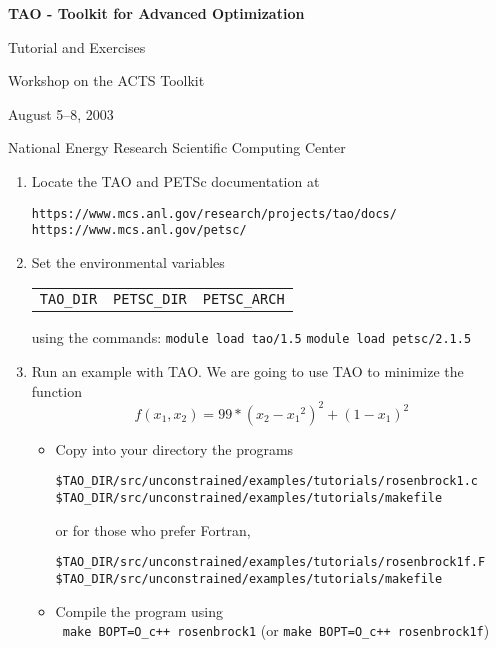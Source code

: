 \documentclass[11pt]{article}
\begin{document}
\begin{center}
{\bf
TAO - Toolkit for Advanced Optimization
        
Tutorial and Exercises

\vspace{0.25in}

Workshop on the ACTS Toolkit

August 5--8, 2003

National Energy Research Scientific Computing Center
}
\end{center}
\vspace{0.25in}

\begin{enumerate}

\item Locate the TAO and PETSc documentation at 
\begin{alltt}
https://www.mcs.anl.gov/research/projects/tao/docs/
https://www.mcs.anl.gov/petsc/
\end{alltt}

\item Set the environmental variables\\
\begin{tabular}{ccc}
\texttt{TAO\_DIR} & \texttt{PETSC\_DIR} & \texttt{PETSC\_ARCH} 
\end{tabular}
using the commands:
\quad \texttt{module load tao/1.5}
\quad \texttt{module load petsc/2.1.5}


\item Run an example with TAO.
We are going to use TAO to minimize the function 
\[
    f(x_1,x_2) = 99*(x_2-{x_1}^2)^2 + (1-x_1)^2 
\]

\begin{itemize}
 \item Copy into your directory the programs
  \begin{alltt}
    \$TAO_DIR/src/unconstrained/examples/tutorials/rosenbrock1.c
    \$TAO_DIR/src/unconstrained/examples/tutorials/makefile
  \end{alltt}
  or for those who prefer Fortran,
  \begin{alltt}
    \$TAO_DIR/src/unconstrained/examples/tutorials/rosenbrock1f.F
    \$TAO_DIR/src/unconstrained/examples/tutorials/makefile
  \end{alltt}

 \item Compile the program using \\
  \quad \texttt{ make BOPT=O\_c++ rosenbrock1} 
  (or \texttt{make BOPT=O\_c++ rosenbrock1f})


\end{itemize}
\end{enumerate}
\end{document}
